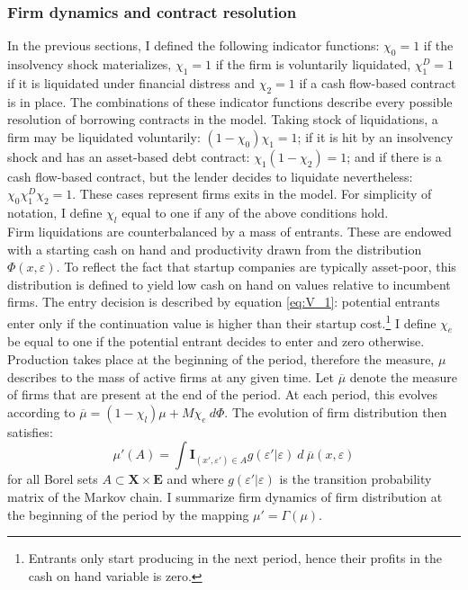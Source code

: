 \documentclass[12pt]{article}
\begin{document}
\subsubsection{Firm dynamics and contract resolution}
In the previous sections, I defined the following indicator functions: $\chi_0 = 1$ if the insolvency shock materializes, $\chi_1 = 1$ if the firm is voluntarily liquidated, $\chi^D_1 = 1$ if it is liquidated under financial distress and $\chi_2 = 1$ if a cash flow-based contract is in place. The combinations of these indicator functions describe every possible resolution of borrowing contracts in the model. Taking stock of liquidations, a firm may be liquidated voluntarily: $(1-\chi_0)\chi_1 = 1$; if it is hit by an insolvency shock and has an asset-based debt contract: $\chi_1(1-\chi_2) = 1$; and if there is a cash flow-based contract, but the lender decides to liquidate nevertheless: $\chi_0 \chi_1^D \chi_2 = 1$. These cases represent firms exits in the model. For simplicity of notation, I define $\chi_l$ equal to one if any of the above conditions hold. \vspace{3mm}\\
Firm liquidations are counterbalanced by a mass of entrants. These are endowed with a starting cash on hand and productivity drawn from the distribution $\Phi(x,\varepsilon)$. To reflect the fact that startup companies are typically asset-poor, this distribution is defined to yield low cash on hand on values relative to incumbent firms. The entry decision is described by equation \ref{eq:V_1}: potential entrants enter only if the continuation value is higher than their startup cost.\footnote{Entrants only start producing in the next period, hence their profits in the cash on hand variable is zero.} I define $\chi_e$ be equal to one if the potential entrant decides to enter and zero otherwise. 
Production takes place at the beginning of the period, therefore the measure, $\mu$ describes to the mass of active firms at any given time. Let $\overline{\mu}$ denote the measure of firms that are present at the end of the period. At each period, this evolves according to $ \overline{\mu} = (1-\chi_l) \mu + M \chi_{e} \ d \Phi$. The evolution of firm distribution then satisfies:
\begin{equation} \label{eq_firmdim} 
    \mu'(A) = \int \mathbf{I}_{(x', \varepsilon') \in A} g(\varepsilon'|\varepsilon) \ d \  \overline{\mu} (x,\varepsilon)
\end{equation}
for all Borel sets $A \subset  \mathbf{X} \times \mathbf{E} $ and where $g(\varepsilon'|\varepsilon)$ is the transition probability matrix of the Markov chain. I summarize firm dynamics of firm distribution at the beginning of the period by the mapping $ \mu' =\Gamma(\mu). $ \vspace{3mm} \\
\end{document}
